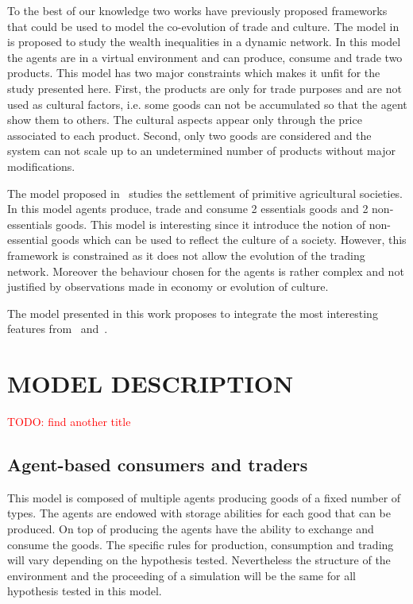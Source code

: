 \documentclass{wscpaperproc}
\newcommand{\memo}[2]{\textcolor{#1}{#2}}
\newcommand{\todo}[1]{\memo{red}{TODO: #1\\}}
\begin{document}
To the best of our knowledge two works have previously proposed frameworks that could be used to model the co-evolution of trade and culture. The model in~\cite{bentley_specialisation_2005} is proposed to study the wealth inequalities in a dynamic network. In this model the agents are in a virtual environment and can produce, consume and trade two products. This model has two major constraints which makes it unfit for the study presented here. First, the products are only for trade purposes and are not used as cultural factors, i.e. some goods can not be accumulated so that the agent show them to others. The cultural aspects appear only through the price associated to each product. Second, only two goods are considered and the system can not scale up to an undetermined number of products without major modifications.

The model proposed in~\cite{macmillan_agent-based_2008} studies the settlement of primitive agricultural societies. In this model agents produce, trade and consume 2 essentials goods and 2 non-essentials goods. This model is interesting since it introduce the notion of non-essential goods which can be used to reflect the culture of a society. However, this framework is constrained as it does not allow the evolution of the trading network. Moreover the behaviour chosen for the agents is rather complex and not justified by observations made in economy or evolution of culture.

The model presented in this work proposes to integrate the most interesting features from~\cite{bentley_specialisation_2005} and~\cite{macmillan_agent-based_2008}.


\section{MODEL DESCRIPTION}

\todo{find another title}
\subsection{Agent-based consumers and traders}

This model is composed of multiple agents producing goods of a fixed number of types. The agents are endowed with storage abilities for each good that can be produced. On top of	producing the agents have the ability to exchange and consume the goods. The specific rules for production, consumption and trading will vary depending on the hypothesis tested. Nevertheless the structure of the environment and the proceeding of a simulation will be the same for all hypothesis tested in this model.
\end{document}
